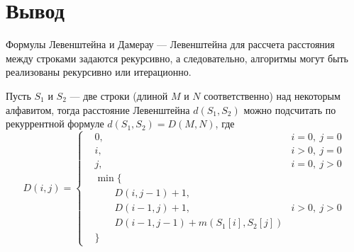 \section*{Вывод}

Формулы Левенштейна и Дамерау — Левенштейна для рассчета расстояния между строками задаются рекурсивно, а следовательно, алгоритмы могут быть реализованы рекурсивно или итерационно.

Пусть $S_{1}$ и $S_{2}$ — две строки (длиной $M$ и $N$ соответственно) над некоторым алфавитом, тогда расстояние Левенштейна $d(S_{1},S_{2})$ можно подсчитать по рекуррентной формуле $d(S_{1},S_{2}) = D(M,N)$, где\\
\begin{equation}
	D(i,j) = 
	\left \{ \begin{aligned}
		& 0, & i = 0, \medspace j = 0\\
		& i, & i > 0, \medspace j = 0\\
		& j, & i = 0, \medspace j > 0\\
		& \min\{ &\\
		& \qquad D(i, j - 1) + 1, & \\
		& \qquad D(i - 1, j) + 1, & i > 0, \medspace j > 0\\
		& \qquad D(i - 1, j - 1) + m(S_{1}[i], S_{2}[j]) &\\
		& \} &
	\end{aligned} \right. 
\end{equation}
